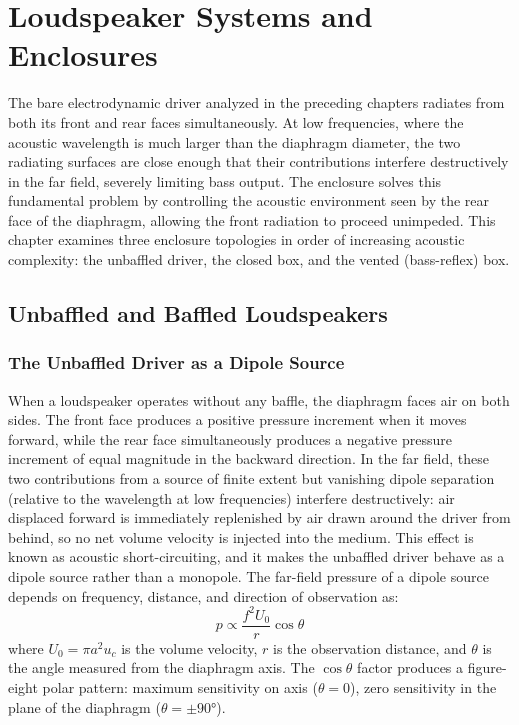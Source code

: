 
\graphicspath{{00_Images/09_chapter/}}

\chapter{Loudspeaker Systems and Enclosures}
\label{ch:enclosures}

The bare electrodynamic driver analyzed in the preceding chapters radiates from both its front and rear faces simultaneously.
At low frequencies, where the acoustic wavelength is much larger than the diaphragm diameter, the two radiating surfaces are close enough that their contributions interfere destructively in the far field, severely limiting bass output.
The enclosure solves this fundamental problem by controlling the acoustic environment seen by the rear face of the diaphragm, allowing the front radiation to proceed unimpeded.
This chapter examines three enclosure topologies in order of increasing acoustic complexity: the unbaffled driver, the closed box, and the vented (bass-reflex) box.

\section{Unbaffled and Baffled Loudspeakers}
\label{sc:91}

\subsection{The Unbaffled Driver as a Dipole Source}
\label{ssc:911}

When a loudspeaker operates without any baffle, the diaphragm faces air on both sides.
The front face produces a positive pressure increment when it moves forward, while the rear face simultaneously produces a negative pressure increment of equal magnitude in the backward direction.
In the far field, these two contributions from a source of finite extent but vanishing dipole separation (relative to the wavelength at low frequencies) interfere destructively: air displaced forward is immediately replenished by air drawn around the driver from behind, so no net volume velocity is injected into the medium.
This effect is known as acoustic short-circuiting, and it makes the unbaffled driver behave as a dipole source rather than a monopole.
The far-field pressure of a dipole source depends on frequency, distance, and direction of observation as:
\[
p \propto \frac{f^2 U_0}{r} \cos\theta
\]
where \(U_0 = \pi a^2 u_c\) is the volume velocity, \(r\) is the observation distance, and \(\theta\) is the angle measured from the diaphragm axis.
The \(\cos\theta\) factor produces a figure-eight polar pattern: maximum sensitivity on axis (\(\theta = 0\)), zero sensitivity in the plane of the diaphragm (\(\theta = \pm 90°\)).

